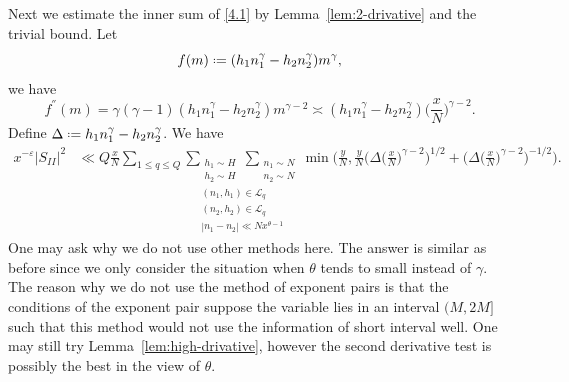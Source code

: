 \documentclass[12pt, reqno, twoside, letterpaper]{amsart}
\numberwithin{equation}{section}
\newcommand{\cL}{\ensuremath{\mathcal{L}}}
\theoremstyle{customthm}
\theoremstyle{customrem}
\newcommand*{\defeq}{\mathrel{\vcenter{\baselineskip0.5ex \lineskiplimit0pt
			\hbox{\scriptsize.}\hbox{\scriptsize.}}}%
	=}
\begin{document}
Next we estimate the inner sum of \eqref{4.1} by Lemma~\ref{lem:2-drivative} and the trivial bound. Let
$$
f(m) \defeq (h_1n^{\gamma}_1 - h_2n^{\gamma}_2)m^\gamma ,
$$
we have
$$
f^{''}(m)=\gamma(\gamma-1)(h_1n^{\gamma}_1 - h_2n^{\gamma}_2)m^{\gamma-2} \asymp (h_1n^{\gamma}_1 - h_2n^{\gamma}_2) \big( \frac{x}{N} \big)^{\gamma-2}.
$$
Define $\Delta \defeq h_1n^{\gamma}_1 - h_2n^{\gamma}_2$. We have
\begin{align}\label{4.2}
x^{-\varepsilon}|S_{II}|^2 &\ll Q\frac{x}{N} \sum_{1 \leqslant q \leqslant Q} \underset{\substack{(n_1,h_1) \in \cL_q \\ (n_2,h_2) \in \cL_q \\ |n_1-n_2| \ll Nx^{\theta-1}}}{\sum_{\substack{h_1 \sim H \\ h_2 \sim H}} \sum_{\substack{n_1 \sim N \\ n_2 \sim N}}} \min{\bigg(\frac{y}{N},\frac{y}{N}\Big(\Delta\big( \frac{x}{N} \big)^{\gamma-2}\Big)^{1/2}+\Big(\Delta\big( \frac{x}{N} \big)^{\gamma-2}\Big)^{-1/2}\bigg)}.
\end{align}
One may ask why we do not use other methods here. The answer is similar as before since we only consider the situation when $\theta$ tends to small instead of $\gamma$. The reason why we do not use the method of exponent pairs is that the conditions of the exponent pair suppose the variable lies in an interval $(M,2M]$ such that this method would not use the information of short interval well. One may still try Lemma~\ref{lem:high-drivative}, however the second derivative test is possibly the best in the view of $\theta$.	
\end{document}
